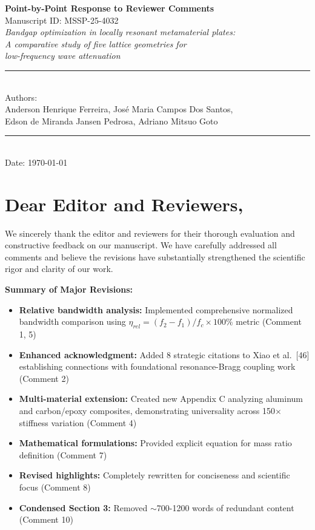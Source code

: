 \documentclass[11pt,a4paper]{article}
\begin{document}
\begin{center}
    {\LARGE \textbf{Point-by-Point Response to Reviewer Comments}}\\[0.5cm]
    {\large Manuscript ID: MSSP-25-4032}\\[0.3cm]
    {\large \textit{Bandgap optimization in locally resonant metamaterial plates:\\
    A comparative study of five lattice geometries for\\
    low-frequency wave attenuation}}\\[0.5cm]
    \rule{\textwidth}{0.4pt}\\[0.3cm]
    {\large Authors:\\
    Anderson Henrique Ferreira, José Maria Campos Dos Santos,\\
    Edson de Miranda Jansen Pedrosa, Adriano Mitsuo Goto}\\[0.3cm]
    \rule{\textwidth}{0.4pt}\\[0.5cm]
    {\large Date: \today}
\end{center}

\vspace{1cm}

\section*{Dear Editor and Reviewers,}

We sincerely thank the editor and reviewers for their thorough evaluation and constructive feedback on our manuscript. We have carefully addressed all comments and believe the revisions have substantially strengthened the scientific rigor and clarity of our work.

\textbf{Summary of Major Revisions:}
\begin{itemize}[leftmargin=1.5cm]
    \item \textbf{Relative bandwidth analysis:} Implemented comprehensive normalized bandwidth comparison using $\eta_{rel} = (f_2-f_1)/f_c \times 100\%$ metric (Comment 1, 5)
    \item \textbf{Enhanced acknowledgment:} Added 8 strategic citations to Xiao et al.~[46] establishing connections with foundational resonance-Bragg coupling work (Comment 2)
    \item \textbf{Multi-material extension:} Created new Appendix C analyzing aluminum and carbon/epoxy composites, demonstrating universality across 150$\times$ stiffness variation (Comment 4)
    \item \textbf{Mathematical formulations:} Provided explicit equation for mass ratio definition (Comment 7)
    \item \textbf{Revised highlights:} Completely rewritten for conciseness and scientific focus (Comment 8)
    \item \textbf{Condensed Section 3:} Removed $\sim$700-1200 words of redundant content (Comment 10)
\end{itemize}
\end{document}
